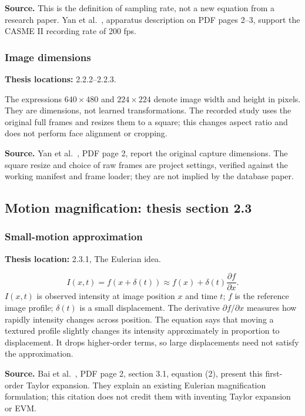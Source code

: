 \documentclass[11pt,a4paper]{article}
\numberwithin{equation}{section}
\begin{document}
\textbf{Source.} This is the definition of sampling rate, not a new equation
from a research paper. Yan et al.~\cite{yan2014}, apparatus description on PDF
pages 2--3, support the CASME II recording rate of 200 fps.

\subsubsection{Image dimensions}
\label{fg:geometry}
\textbf{Thesis locations:} 2.2.2--2.2.3.

The expressions $640\times480$ and $224\times224$ denote image width and height
in pixels. They are dimensions, not learned transformations. The recorded study
uses the original full frames and resizes them to a square; this changes aspect
ratio and does not perform face alignment or cropping.

\textbf{Source.} Yan et al.~\cite{yan2014}, PDF page 2, report the original
capture dimensions. The square resize and choice of raw frames are project
settings, verified against the working manifest and frame loader; they are not
implied by the database paper.

\subsection{Motion magnification: thesis section 2.3}

\subsubsection{Small-motion approximation}
\label{fg:evm}
\textbf{Thesis location:} 2.3.1, The Eulerian idea.

\begin{equation}
    I(x,t)=f(x+\delta(t))
       \approx f(x)+\delta(t)\frac{\partial f}{\partial x}.
    \label{fg:eq:evm-taylor}
\end{equation}
$I(x,t)$ is observed intensity at image position $x$ and time $t$; $f$ is the
reference image profile; $\delta(t)$ is a small displacement. The derivative
$\partial f/\partial x$ measures how rapidly intensity changes across position.
The equation says that moving a textured profile slightly changes its intensity
approximately in proportion to displacement. It drops higher-order terms, so
large displacements need not satisfy the approximation.

\textbf{Source.} Bai et al.~\cite{bai2021}, PDF page 2, section 3.1,
equation (2), present this first-order Taylor expansion. They explain an existing
Eulerian magnification formulation; this citation does not credit them with
inventing Taylor expansion or EVM.
\end{document}
